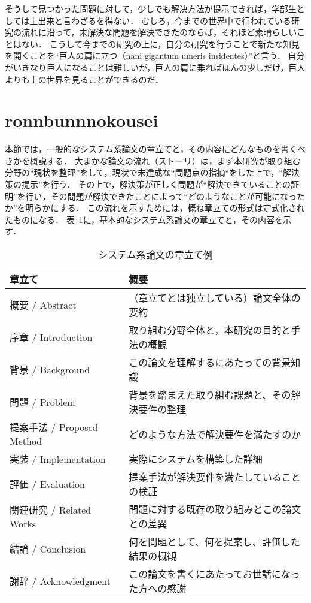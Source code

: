 そうして見つかった問題に対して，少しでも解決方法が提示できれば，学部生としては上出来と言わざるを得ない．
むしろ，今までの世界中で行われている研究の流れに沿って，未解決な問題を解決できたのならば，それほど素晴らしいことはない．
こうして今までの研究の上に，自分の研究を行うことで新たな知見を開くことを``巨人の肩に立つ（nani gigantum umeris insidentes）''と言う．
自分がいきなり巨人になることは難しいが，巨人の肩に乗ればほんの少しだけ，巨人よりも上の世界を見ることができるのだ．

\section{ronnbunnnokousei}
\label{background:structure}
本節では，一般的なシステム系論文の章立てと，その内容にどんなものを書くべきかを概説する．
大まかな論文の流れ（ストーリ）は，まず本研究が取り組む分野の``現状を整理''をして，現状で未達成な``問題点の指摘``をした上で，``解決策の提示''を行う．
その上で，解決策が正しく問題が``解決できていることの証明''を行い，その問題が解決できたことによって``どのようなことが可能になったか''を明らかにする．
この流れを示すためには，概ね章立ての形式は定式化されたものになる．
表~\ref{table:structurepaper}に，基本的なシステム系論文の章立てと，その内容を示す．

\begin{table}[!hbtp]
    \begin{center}
        \caption{システム系論文の章立て例}
				\label{table:structurepaper}
  			\begin{tabular}{|l|l|}
					\hline
          章立て & 概要 \\
					\hline
          概要 / Abstract & （章立てとは独立している）論文全体の要約 \\
					\hline
          序章 / Introduction & 取り組む分野全体と，本研究の目的と手法の概観\\
					\hline
          背景 / Background & この論文を理解するにあたっての背景知識\\
					\hline
          問題 / Problem & 背景を踏まえた取り組む課題と、その解決要件の整理 \\
					\hline
          提案手法 / Proposed Method & どのような方法で解決要件を満たすのか \\
					\hline
          実装 / Implementation & 実際にシステムを構築した詳細 \\
					\hline
          評価 / Evaluation & 提案手法が解決要件を満たしていることの検証 \\
					\hline
          関連研究 / Related Works & 問題に対する既存の取り組みとこの論文との差異 \\
					\hline
          結論 / Conclusion & 何を問題として、何を提案し、評価した結果の概観\\
  				\hline
					\hline
          謝辞 / Acknowledgment & この論文を書くにあたってお世話になった方への感謝\\
  				\hline
				\end{tabular}
		\end{center}
\end{table}

